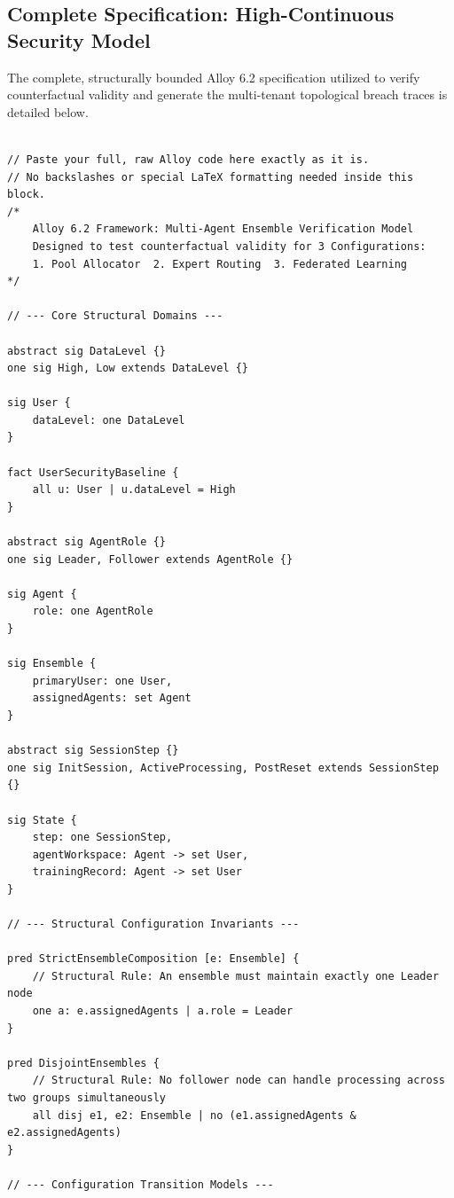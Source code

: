 \subsection*{Complete Specification: High-Continuous Security Model}
\label{app:pcc_alloy}

The complete, structurally bounded Alloy 6.2 specification utilized to verify counterfactual validity and generate the multi-tenant topological breach traces is detailed below.
\begin{lstlisting}[language=Alloy, caption={Complete Multi-Agent \& Isolation Architecture Verification Script}]

// Paste your full, raw Alloy code here exactly as it is.
// No backslashes or special LaTeX formatting needed inside this block.
/*
    Alloy 6.2 Framework: Multi-Agent Ensemble Verification Model
    Designed to test counterfactual validity for 3 Configurations:
    1. Pool Allocator  2. Expert Routing  3. Federated Learning
*/

// --- Core Structural Domains ---

abstract sig DataLevel {}
one sig High, Low extends DataLevel {}

sig User {
    dataLevel: one DataLevel
}

fact UserSecurityBaseline {
    all u: User | u.dataLevel = High
}

abstract sig AgentRole {}
one sig Leader, Follower extends AgentRole {}

sig Agent {
    role: one AgentRole
}

sig Ensemble {
    primaryUser: one User,
    assignedAgents: set Agent
}

abstract sig SessionStep {}
one sig InitSession, ActiveProcessing, PostReset extends SessionStep {}

sig State {
    step: one SessionStep,
    agentWorkspace: Agent -> set User,
    trainingRecord: Agent -> set User
}

// --- Structural Configuration Invariants ---

pred StrictEnsembleComposition [e: Ensemble] {
    // Structural Rule: An ensemble must maintain exactly one Leader node
    one a: e.assignedAgents | a.role = Leader
}

pred DisjointEnsembles {
    // Structural Rule: No follower node can handle processing across two groups simultaneously
    all disj e1, e2: Ensemble | no (e1.assignedAgents & e2.assignedAgents)
}

// --- Configuration Transition Models ---


\end{lstlisting}
